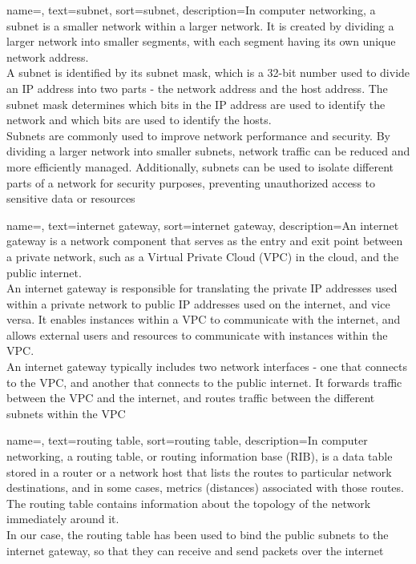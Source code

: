 {
    name=,
    text=subnet,
    sort=subnet,
    description={In computer networking, a subnet is a smaller network within a larger network. It is created by dividing a larger network into smaller segments, with each segment having its own unique network address.\\
    A subnet is identified by its subnet mask, which is a 32-bit number used to divide an IP address into two parts - the network address and the host address. The subnet mask determines which bits in the IP address are used to identify the network and which bits are used to identify the hosts.\\
    Subnets are commonly used to improve network performance and security. By dividing a larger network into smaller subnets, network traffic can be reduced and more efficiently managed. Additionally, subnets can be used to isolate different parts of a network for security purposes, preventing unauthorized access to sensitive data or resources}
}

{
    name=,
    text=internet gateway,
    sort=internet gateway,
    description={An internet gateway is a network component that serves as the entry and exit point between a private network, such as a Virtual Private Cloud (VPC) in the cloud, and the public internet.\\
    An internet gateway is responsible for translating the private IP addresses used within a private network to public IP addresses used on the internet, and vice versa. It enables instances within a VPC to communicate with the internet, and allows external users and resources to communicate with instances within the VPC.\\    
    An internet gateway typically includes two network interfaces - one that connects to the VPC, and another that connects to the public internet. It forwards traffic between the VPC and the internet, and routes traffic between the different subnets within the VPC}
}

{
    name=,
    text=routing table,
    sort=routing table,
    description={In computer networking, a routing table, or routing information base (RIB), is a data table stored in a router or a network host that lists the routes to particular network destinations, and in some cases, metrics (distances) associated with those routes. The routing table contains information about the topology of the network immediately around it.\\
    In our case, the routing table has been used to bind the public subnets to the internet gateway, so that they can receive and send packets over the internet}
}